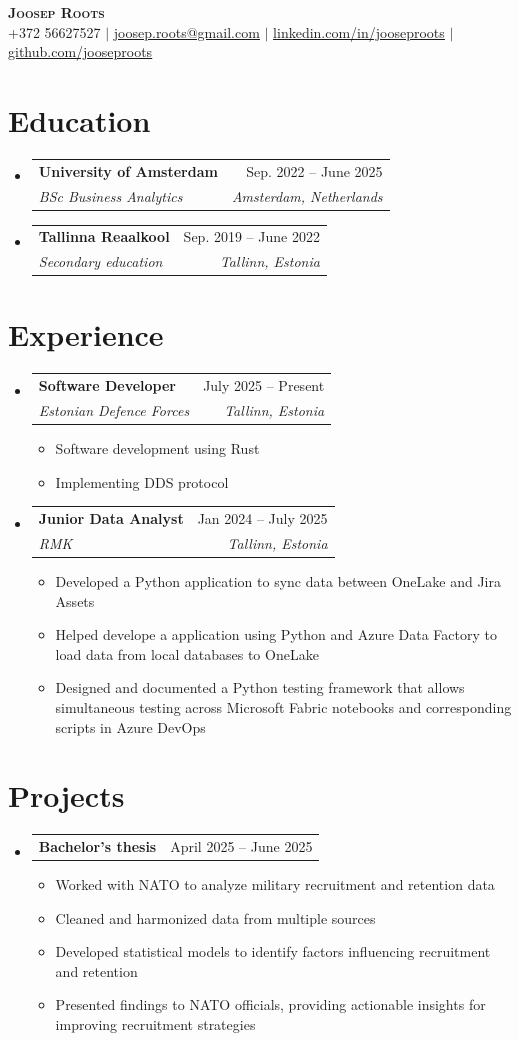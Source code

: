 \documentclass[letterpaper,11pt]{article}
\makeatletter
\newcommand{\resumeItem}[1]{
  \item\small{
    {#1 \vspace{-2pt}}
  }
}
\newcommand{\resumeSubheading}[4]{
  \vspace{-2pt}\item
    \begin{tabular*}{0.97\textwidth}[t]{l@{\extracolsep{\fill}}r}
      \textbf{#1} & #2 \\
      \textit{\small#3} & \textit{\small #4} \\
    \end{tabular*}\vspace{-7pt}
}
\newcommand{\resumeProjectHeading}[2]{
    \item
    \begin{tabular*}{0.97\textwidth}{l@{\extracolsep{\fill}}r}
      \small#1 & #2 \\
    \end{tabular*}\vspace{-7pt}
}
\newcommand{\resumeSubHeadingListStart}{\begin{itemize}[leftmargin=0.15in, label={}]}
\newcommand{\resumeSubHeadingListEnd}{\end{itemize}}
\newcommand{\resumeItemListStart}{\begin{itemize}}
\newcommand{\resumeItemListEnd}{\end{itemize}\vspace{-5pt}}
\makeatother
\begin{document}
\begin{center}
    \textbf{\Huge \scshape Joosep Roots} \\ \vspace{1pt}
    \small +372 56627527 $|$ \href{mailto:joosep.roots@gmail.com}{\underline{joosep.roots@gmail.com}} $|$ 
    \href{https://www.linkedin.com/in/jooseproots}{\underline{linkedin.com/in/jooseproots}} $|$
    \href{https://github.com/jooseproots}{\underline{github.com/jooseproots}}
\end{center}


\section{Education}
  \resumeSubHeadingListStart
    \resumeSubheading
      {University of Amsterdam}{Sep. 2022 -- June 2025}
      {BSc Business Analytics}{Amsterdam, Netherlands}
    \resumeSubheading
      {Tallinna Reaalkool}{Sep. 2019 -- June 2022}
      {Secondary education}{Tallinn, Estonia}
  \resumeSubHeadingListEnd


\section{Experience}
  \resumeSubHeadingListStart

    \resumeSubheading
      {Software Developer}{July 2025 -- Present}
      {Estonian Defence Forces}{Tallinn, Estonia}
      \resumeItemListStart
        \resumeItem{Software development using Rust}
        \resumeItem{Implementing DDS protocol}
      \resumeItemListEnd

    \resumeSubheading
      {Junior Data Analyst}{Jan 2024 -- July 2025}
      {RMK}{Tallinn, Estonia}
      \resumeItemListStart
        \resumeItem{Developed a Python application to sync data between OneLake and Jira Assets}
        \resumeItem{Helped develope a application using Python and Azure Data Factory to load data from local databases to OneLake}
        \resumeItem{Designed and documented a Python testing framework that allows simultaneous testing across Microsoft Fabric notebooks and corresponding scripts in Azure DevOps}
      \resumeItemListEnd

  \resumeSubHeadingListEnd


\section{Projects}
    \resumeSubHeadingListStart
      \resumeProjectHeading
          {\textbf{Bachelor's thesis}}{April 2025 -- June 2025}
          \resumeItemListStart
            \resumeItem{Worked with NATO to analyze military recruitment and retention data}
            \resumeItem{Cleaned and harmonized data from multiple sources}
            \resumeItem{Developed statistical models to identify factors influencing recruitment and retention}
            \resumeItem{Presented findings to NATO officials, providing actionable insights for improving recruitment strategies}
          \resumeItemListEnd
    \resumeSubHeadingListEnd
\end{document}
